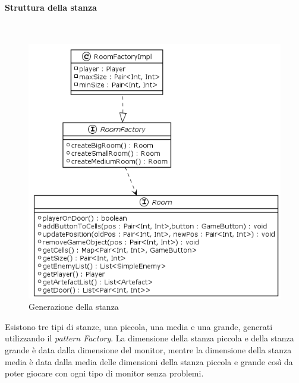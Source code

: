 \documentclass[a4paper,titlepage,12pt]{article}
\begin{document}
\paragraph{Struttura della stanza}
\par \noindent \\
\begin{figure}[H]
    \centering
    \includegraphics[scale=0.7]{img/uml/Room.png}
    \caption{Generazione della stanza}
    \label{fig: Stanza}
\end{figure}
\par \noindent Esistono tre tipi di stanze, una piccola, una media e una grande, generati utilizzando il  \textit{pattern Factory}. La dimensione della stanza piccola e della stanza grande è data dalla dimensione del monitor, mentre la dimensione della stanza media è data dalla media delle dimensioni della stanza piccola e grande così da poter giocare con ogni tipo di monitor senza problemi.
\end{document}
